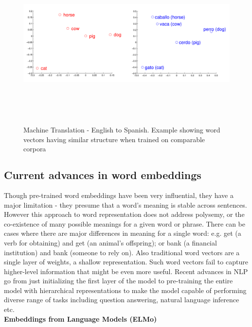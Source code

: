 \begin{figure}[htbp]
\centering
\includegraphics[width=16cm, height=8cm]{images/machine-translation.PNG}\\
\centering
\caption{Machine Translation - English to Spanish. Example showing word vectors having similar structure when trained on comparable corpora}
\label{fig:foo}
\end{figure}

\newpage
\subsection{Current advances in word embeddings}

Though pre-trained word embeddings have been very influential, they have a major limitation - they presume that a word's meaning is stable across sentences. However this approach to word representation does not address polysemy, or the co-existence of many possible meanings for a given word or phrase. There can be cases where there are major differences in meaning for a single word: e.g. get (a verb for obtaining) and get (an animal's offspring); or bank (a financial institution) and bank (someone to rely on). Also traditional word vectors are a single layer of weights, a shallow representation. Such word vectors fail to capture higher-level information that might be even more useful. Recent advances in NLP go from just initializing the first layer of the model to pre-training the entire model with hierarchical representations to make the model capable of performing diverse range of tasks including question answering, natural language inference etc.\\

\noindent \textbf{Embeddings from Language Models (ELMo)}\\

